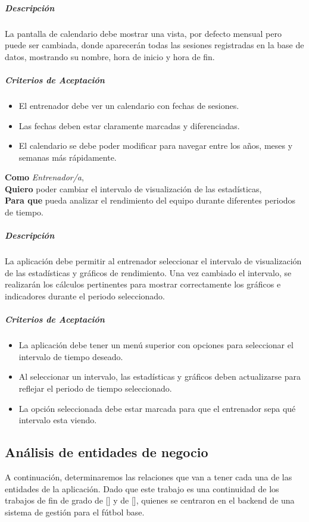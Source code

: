 \subparagraph{Descripción}
La pantalla de calendario debe mostrar una vista, por defecto mensual pero puede ser cambiada, donde aparecerán todas las sesiones registradas en la base de datos, mostrando su nombre, hora de inicio y hora de fin.

\subparagraph{Criterios de Aceptación}
\begin{itemize}
\item El entrenador debe ver un calendario con fechas de sesiones.
\item Las fechas deben estar claramente marcadas y diferenciadas.
\item El calendario se debe poder modificar para navegar entre los años, meses y semanas más rápidamente.
\end{itemize}
\begin{tcolorbox}[title= Cambiar intervalo de visualización]
\textbf{Como} \textit{Entrenador/a},\\
\textbf{Quiero} poder cambiar el intervalo de visualización de las estadísticas,\\
\textbf{Para que} pueda analizar el rendimiento del equipo durante diferentes periodos de tiempo.
\end{tcolorbox}

\subparagraph{Descripción}
La aplicación debe permitir al entrenador seleccionar el intervalo de visualización de las estadísticas y gráficos de rendimiento. Una vez cambiado el intervalo, se realizarán los cálculos pertinentes para mostrar correctamente los gráficos e indicadores durante el periodo seleccionado.

\subparagraph{Criterios de Aceptación}
\begin{itemize}
\item La aplicación debe tener un menú superior con opciones para seleccionar el intervalo de tiempo deseado.
\item Al seleccionar un intervalo, las estadísticas y gráficos deben actualizarse para reflejar el periodo de tiempo seleccionado.
\item La opción seleccionada debe estar marcada para que el entrenador sepa qué intervalo esta viendo.
\end{itemize}



\subsection{Análisis de entidades de negocio}
\label{subsec:ent_nego_analysis}
A continuación, determinaremos las relaciones que van a tener cada una de las entidades de la aplicación. Dado que este trabajo es una continuidad de los trabajos de fin de grado de [\cite{TFG_Daniel}] y de [\cite{TFG_Sergio}], quienes se centraron en el backend de una sistema de gestión para el fútbol base.

